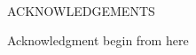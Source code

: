 
\renewcommand{\baselinestretch}{2}
\small\normalsize
\hbox{\ }
 
\vspace{-.65in}

\begin{center}
\large{ACKNOWLEDGEMENTS} 
\end{center} 

\vspace{1ex}

Acknowledgment begin from here

